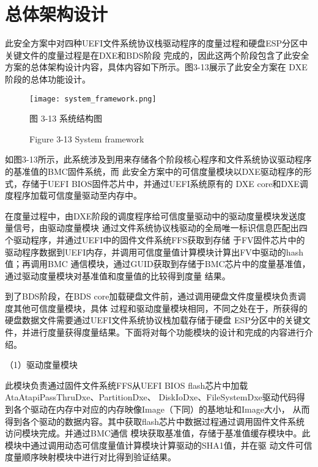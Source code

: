 %
%
\section{总体架构设计}
此安全方案中对四种UEFI文件系统协议栈驱动程序的度量过程和硬盘ESP分区中关键文件的度量过程是在DXE和BDS阶段
完成的，因此这两个阶段包含了此安全方案的总体架构设计内容，具体内容如下所示。图3-13展示了此安全方案在
DXE阶段的总体功能设计。

\begin{figure}[htb]
    \vspace{0cm}   
    \setlength{\abovecaptionskip}{0.3cm}
	\centering
    \texttt{[image: system\_framework.png]}
    \caption*{图 3-13 系统结构图}
    \setlength{\belowcaptionskip}{-0.7cm}
    \caption*{Figure 3-13 System framework}
\end{figure}

如图3-13所示，此系统涉及到用来存储各个阶段核心程序和文件系统协议驱动程序的基准值的BMC固件系统，而
此安全方案中的可信度量模块以DXE驱动程序的形式，存储于UEFI BIOS固件芯片中，并通过UEFI系统原有的
DXE core和DXE调度程序加载可信度量驱动至内存中。
\par 在度量过程中，由DXE阶段的调度程序给可信度量驱动中的驱动度量模块发送度量信号，由驱动度量模块
通过文件系统协议栈驱动的全局唯一标识信息匹配出四个驱动程序，并通过UEFI中的固件文件系统FFS获取到存储
于FV固件芯片中的驱动程序数据到UEFI内存，并调用可信度量值计算模块计算出FV中驱动的hash值；再调用BMC
通信模块，通过GUID获取到存储于BMC芯片中的度量基准值，通过驱动度量模块对基准值和度量值的比较得到度量
结果。
\par 到了BDS阶段，在BDS core加载硬盘文件前，通过调用硬盘文件度量模块负责调度其他可信度量模块，具体
过程和驱动度量模块相同，不同之处在于，所获得的硬盘数据文件需要通过UEFI文件系统协议栈加载存储于硬盘
ESP分区中的关键文件，并进行度量获得度量结果。下面将对每个功能模块的设计和完成的内容进行介绍。

\par （1）驱动度量模块
\par 此模块负责通过固件文件系统FFS从UEFI BIOS flash芯片中加载AtaAtapiPassThruDxe、PartitionDxe、
DiskIoDxe、FileSystemDxe驱动代码得到各个驱动在内存中对应的内存映像Image（下同）的基地址和Image大小，
从而得到各个驱动的数据内容。其中获取flash芯片中数据过程通过调用固件文件系统访问模块完成。并通过BMC通信
模块获取基准值，存储于基准值缓存模块中。此模块中通过调用动态可信度量值计算模块计算驱动的SHA1值，并在驱
动文件可信度量顺序映射模块中进行对比得到验证结果。

